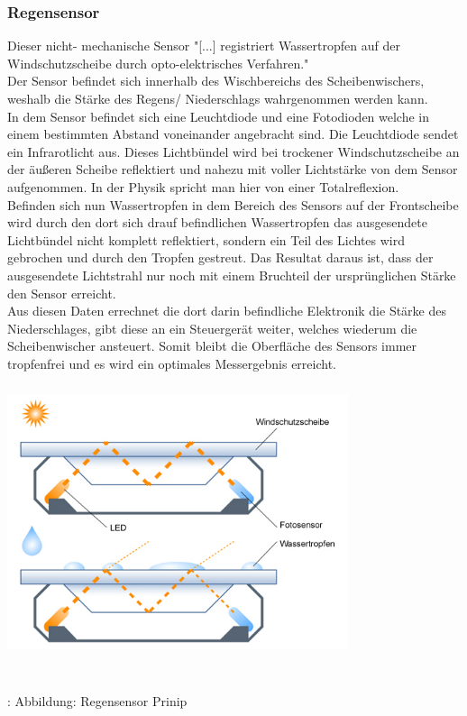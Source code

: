 \documentclass{article}
\begin{document}
			\subsubsection{Regensensor}
				Dieser nicht- mechanische Sensor "[...] registriert Wassertropfen auf der Windschutzscheibe durch opto-elektrisches Verfahren." \cite{TS15}\\
				Der Sensor befindet sich innerhalb des Wischbereichs des Scheibenwischers, weshalb die Stärke des Regens/ Niederschlags wahrgenommen werden kann.\\
				In dem Sensor befindet sich eine Leuchtdiode und eine Fotodioden welche in einem bestimmten Abstand voneinander angebracht sind. Die Leuchtdiode sendet ein Infrarotlicht aus. Dieses Lichtbündel wird bei trockener Windschutzscheibe an der äußeren Scheibe reflektiert und nahezu mit voller Lichtstärke von dem Sensor aufgenommen. In der Physik spricht man hier von einer Totalreflexion.\\
				Befinden sich nun Wassertropfen in dem Bereich des Sensors auf der Frontscheibe wird durch den dort sich drauf befindlichen Wassertropfen das ausgesendete Lichtbündel nicht komplett reflektiert, sondern ein Teil des Lichtes wird gebrochen und durch den Tropfen gestreut. Das Resultat daraus ist, dass der ausgesendete Lichtstrahl nur noch mit einem Bruchteil der ursprünglichen Stärke den Sensor erreicht.\\
				Aus diesen Daten errechnet die dort darin befindliche Elektronik die Stärke des Niederschlages, gibt diese an ein Steuergerät weiter, welches wiederum die Scheibenwischer ansteuert. Somit bleibt die Oberfläche des Sensors immer tropfenfrei und es wird ein optimales Messergebnis erreicht.
				
				\begin{center}
					\includegraphics[width=10cm, height=8cm] {Images/Kapitel5/regensensor.png}
					\caption {\\\cite{TS16}: Abbildung: Regensensor Prinip}
				\end{center}	
			
\end{document}
